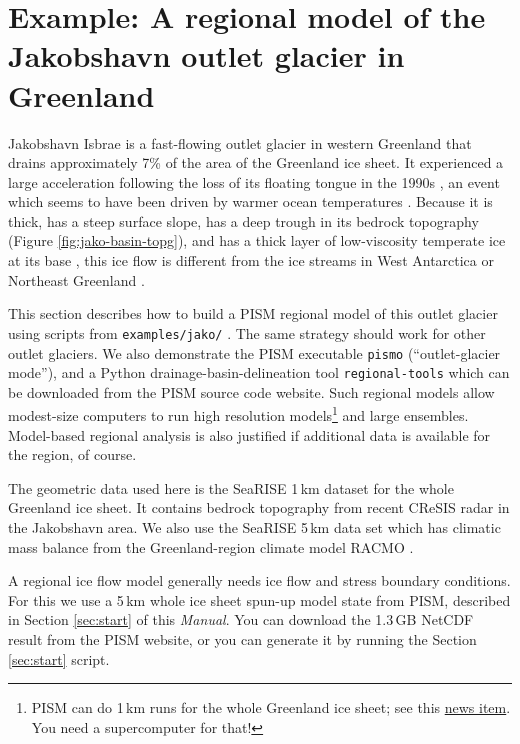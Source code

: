 
\section{Example: A regional model of the Jakobshavn outlet glacier in Greenland}\label{sec:jako}  


Jakobshavn Isbrae is a fast-flowing outlet glacier in western Greenland that drains approximately 7\% of the area of the Greenland ice sheet.  It experienced a large acceleration following the loss of its floating tongue in the 1990s \cite{JoughinAbdalatiFahnestock}, an event which seems to have been driven by warmer ocean temperatures \cite{Hollandetal2008}.  Because it is thick, has a steep surface slope, has a deep trough in its bedrock topography (Figure \ref{fig:jako-basin-topg}), and has a thick layer of low-viscosity temperate ice at its base \cite{Luethietal2009}, this ice flow is different from the ice streams in West Antarctica or Northeast Greenland \cite{TrufferEchelmeyer}.
 
This section describes how to build a PISM regional model of this outlet glacier using scripts from \texttt{examples/jako/} \cite{DellaGiustina2011}.  The same strategy should work for other outlet glaciers.  We also demonstrate the PISM executable \texttt{pismo} (``outlet-glacier mode''), and a Python drainage-basin-delineation tool \texttt{regional-tools} which can be downloaded from the PISM source code website.  Such regional models allow modest-size computers to run high resolution models\footnote{PISM can do 1\,km runs for the whole Greenland ice sheet; see this \href{http://www.pism-docs.org/wiki/doku.php?id=news:first1km}{news item}.  You need a supercomputer for that!} and large ensembles.  Model-based regional analysis is also justified if additional data is available for the region, of course.

The geometric data used here is the SeaRISE  \cite{Bindschadler2013SeaRISE} 1\,km dataset for the whole Greenland ice sheet.  It contains bedrock topography from recent CReSIS radar in the Jakobshavn area.  We also use the SeaRISE 5\,km data set which has climatic mass balance from the Greenland-region climate model RACMO \cite{Ettemaetal2009}.

A regional ice flow model generally needs ice flow and stress boundary conditions.  For this we use a 5\,km whole ice sheet spun-up model state from PISM, described in Section \ref{sec:start} of this \emph{Manual}.  You can download the 1.3\,GB NetCDF result from the PISM website, or you can generate it by running the Section \ref{sec:start} script. 

